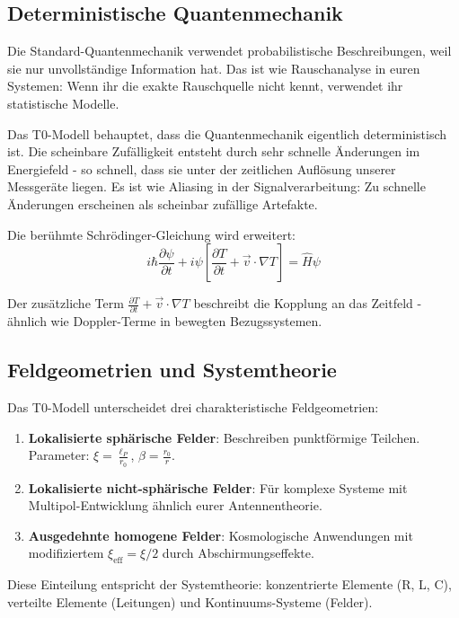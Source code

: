 \documentclass[12pt,a4paper]{article}
\begin{document}
\subsection{Deterministische Quantenmechanik}

Die Standard-Quantenmechanik verwendet probabilistische Beschreibungen, weil sie nur unvollständige Information hat. Das ist wie Rauschanalyse in euren Systemen: Wenn ihr die exakte Rauschquelle nicht kennt, verwendet ihr statistische Modelle.

Das T0-Modell behauptet, dass die Quantenmechanik eigentlich deterministisch ist. Die scheinbare Zufälligkeit entsteht durch sehr schnelle Änderungen im Energiefeld - so schnell, dass sie unter der zeitlichen Auflösung unserer Messgeräte liegen. Es ist wie Aliasing in der Signalverarbeitung: Zu schnelle Änderungen erscheinen als scheinbar zufällige Artefakte.

Die berühmte Schrödinger-Gleichung wird erweitert:
$$i\hbar\frac{\partial\psi}{\partial t} + i\psi\left[\frac{\partial T}{\partial t} + \vec{v} \cdot \nabla T\right] = \hat{H}\psi$$

Der zusätzliche Term $\frac{\partial T}{\partial t} + \vec{v} \cdot \nabla T$ beschreibt die Kopplung an das Zeitfeld - ähnlich wie Doppler-Terme in bewegten Bezugssystemen.

\subsection{Feldgeometrien und Systemtheorie}

Das T0-Modell unterscheidet drei charakteristische Feldgeometrien:

\begin{enumerate}
	\item \textbf{Lokalisierte sphärische Felder}: Beschreiben punktförmige Teilchen. Parameter: $\xi = \frac{\ell_P}{r_0}$, $\beta = \frac{r_0}{r}$.
	\item \textbf{Lokalisierte nicht-sphärische Felder}: Für komplexe Systeme mit Multipol-Entwicklung ähnlich eurer Antennentheorie.
	\item \textbf{Ausgedehnte homogene Felder}: Kosmologische Anwendungen mit modifiziertem $\xi_{\text{eff}} = \xi/2$ durch Abschirmungseffekte.
\end{enumerate}

Diese Einteilung entspricht der Systemtheorie: konzentrierte Elemente (R, L, C), verteilte Elemente (Leitungen) und Kontinuums-Systeme (Felder).
\end{document}
